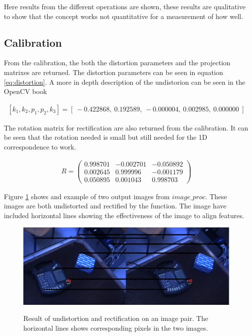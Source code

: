 Here results from the different operations are shown, these results are qualitative to show that the concept works not quantitative for a measurement of how well.

\subsection{Calibration}

From the calibration, the both the distortion parameters and the projection matrixes are returned. The distortion parameters can be seen in equation \ref{eq:distortion}. A more in depth description of the undistorion can be seen in the OpenCV book %




\begin{equation}\label{eq:distortion}
\begin{split}
[ k_{1}, k_{2}, p_{1}, p_{2}, k_{3} ] = [\ -0.422868,\ 0.192589,\ -0.000004,\ 0.002985,\ 0.000000\ ]
\end{split}
\end{equation} 

The rotation matrix for rectification are also returned from the calibration. It can be seen that the rotation needed is small but still needed for the 1D correspondence to work. 

\begin{equation}\label{eq:distortion}
\begin{split}
R =
 \begin{pmatrix}
  0.998701 & -0.002701 & -0.050892 \\
  0.002645 & 0.999996 & -0.001179 \\
  0.050895 & 0.001043 & 0.998703 
 \end{pmatrix}
\end{split}
\end{equation}

Figure \ref{fig:rectified} shows and example of two output images from $image\_proc$. These images are both undistorted and rectified by the function. The image have included horizontal lines showing the effectiveness of the image to align features.

\begin{figure}[h!]
  \caption{Result of undistortion and rectification on an image pair. The horizontal lines shows corresponding pixels in the two images.}
  \centering
    \includegraphics[width=\textwidth]{graphics/06_vision/rectified.jpg}
    \label{fig:rectified}
\end{figure}

